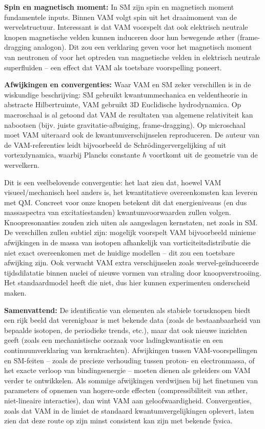 \textbf{Spin en magnetisch moment:} In SM zijn spin en magnetisch moment fundamentele inputs. Binnen VAM volgt spin uit het draaimoment van de wervelstructuur. Interessant is dat VAM voorspelt dat ook elektrisch neutrale knopen magnetische velden kunnen induceren door hun bewegende æther (frame-dragging analogon). Dit zou een verklaring geven voor het magnetisch moment van neutronen of voor het optreden van magnetische velden in elektrisch neutrale superfluïden – een effect dat VAM als toetsbare voorspelling poneert.

\textbf{Afwijkingen en convergenties:} Waar VAM en SM zeker verschillen is in de wiskundige beschrijving: SM gebruikt kwantummechanica en veldentheorie in abstracte Hilbertruimte, VAM gebruikt 3D Euclidische hydrodynamica. Op macroschaal is al getoond dat VAM de resultaten van algemene relativiteit kan nabootsen (bijv. juiste gravitatie-afbuiging, frame-dragging). Op microschaal moet VAM uiteraard ook de kwantumverschijnselen reproduceren. De auteur van de VAM-referenties leidt bijvoorbeeld de Schrödingervergelijking af uit vortexdynamica, waarbij Plancks constante $\hbar$ voortkomt uit de geometrie van de wervelkern.

Dit is een veelbelovende convergentie: het laat zien dat, hoewel VAM visueel/mechanisch heel anders is, het kwantitatieve overeenkomsten kan leveren met QM. Concreet voor onze knopen betekent dit dat energieniveaus (en dus massaspectra van excitatiestanden) kwantumvoorwaarden zullen volgen. Knoopresonanties zouden zich uiten als aangeslagen kernstaten, net zoals in SM. De verschillen zullen subtiel zijn: mogelijk voorspelt VAM bijvoorbeeld minieme afwijkingen in de massa van isotopen afhankelijk van vorticiteitsdistributie die niet exact overeenkomen met de huidige modellen – dit zou een toetsbare afwijking zijn. Ook verwacht VAM extra verschijnselen zoals wervel-geïnduceerde tijdsdilatatie binnen nuclei of nieuwe vormen van straling door knoopverstrooiing. Het standaardmodel heeft die niet, dus hier kunnen experimenten onderscheid maken.

\textbf{Samenvattend:} De identificatie van elementen als stabiele torusknopen biedt een rijk beeld dat verenigbaar is met bekende data (zoals de bestaanbaarheid van bepaalde isotopen, de periodieke trends, etc.), maar dat ook nieuwe inzichten geeft (zoals een mechanistische oorzaak voor ladingkwantisatie en een continuumverklaring van kernkrachten). Afwijkingen tussen VAM-voorspellingen en SM-feiten – zoals de precieze verhouding tussen proton- en electronmassa, of het exacte verloop van bindingsenergie – moeten dienen als geleiders om VAM verder te ontwikkelen. Als sommige afwijkingen verdwijnen bij het finetunen van parameters of opnemen van hogere-orde effecten (compressibiliteit van æther, niet-lineaire interacties), dan wint VAM aan geloofwaardigheid. Convergenties, zoals dat VAM in de limiet de standaard kwantumvergelijkingen oplevert, laten zien dat deze route op zijn minst consistent kan zijn met bekende fysica.